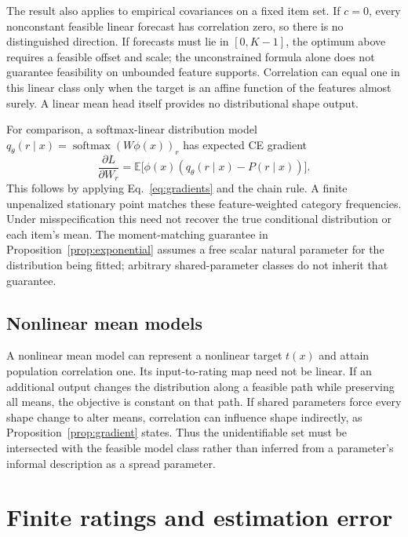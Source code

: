\documentclass[11pt,letterpaper]{article}
\newcommand{\E}{\mathbb{E}}
\DeclareMathOperator{\softmax}{softmax}
\begin{document}
The result also applies to empirical covariances on a fixed item set.
If $c=0$, every nonconstant feasible linear forecast has correlation zero, so there is no distinguished direction.
If forecasts must lie in $[0,K-1]$, the optimum above requires a feasible offset and scale; the unconstrained formula alone does not guarantee feasibility on unbounded feature supports.
Correlation can equal one in this linear class only when the target is an affine function of the features almost surely.
A linear mean head itself provides no distributional shape output.

For comparison, a softmax-linear distribution model $q_\theta(r\mid x)=\softmax(W\phi(x))_r$ has expected CE gradient
\[
 \frac{\partial L}{\partial W_r}=\E\big[\phi(x)(q_\theta(r\mid x)-P(r\mid x))\big].
\]
This follows by applying Eq.~\eqref{eq:gradients} and the chain rule.
A finite unpenalized stationary point matches these feature-weighted category frequencies.
Under misspecification this need not recover the true conditional distribution or each item's mean.
The moment-matching guarantee in Proposition~\ref{prop:exponential} assumes a free scalar natural parameter for the distribution being fitted; arbitrary shared-parameter classes do not inherit that guarantee.

\subsection{Nonlinear mean models}
A nonlinear mean model can represent a nonlinear target $t(x)$ and attain population correlation one.
Its input-to-rating map need not be linear.
If an additional output changes the distribution along a feasible path while preserving all means, the objective is constant on that path.
If shared parameters force every shape change to alter means, correlation can influence shape indirectly, as Proposition~\ref{prop:gradient} states.
Thus the unidentifiable set must be intersected with the feasible model class rather than inferred from a parameter's informal description as a spread parameter.

\section{Finite ratings and estimation error}
\end{document}
